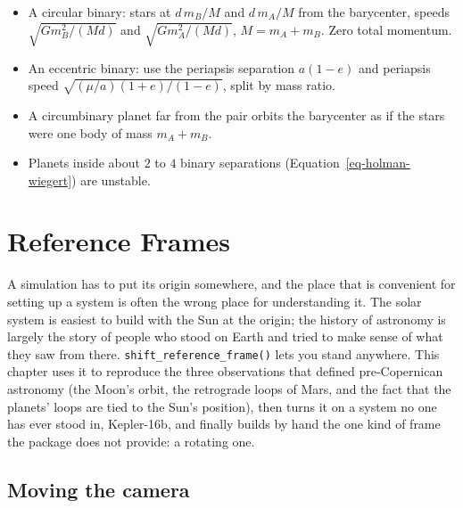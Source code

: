 \documentclass[
  10.5pt,
  letterpaper,
]{scrbook}
\providecommand{\tightlist}{%
  \setlength{\itemsep}{0pt}\setlength{\parskip}{0pt}}
\theoremstyle{plain}
\theoremstyle{remark}
\begin{document}
\begin{tcolorbox}[enhanced jigsaw, arc=.35mm, bottomrule=.15mm, bottomtitle=1mm, breakable, colback=white, colbacktitle=quarto-callout-tip-color!10!white, colframe=quarto-callout-tip-color-frame, coltitle=black, left=2mm, leftrule=.75mm, opacityback=0, opacitybacktitle=0.6, rightrule=.15mm, title={Key results}, titlerule=0mm, toprule=.15mm, toptitle=1mm]

\begin{itemize}
\tightlist
\item
  A circular binary: stars at \(d\,m_B/M\) and \(d\,m_A/M\) from the
  barycenter, speeds \(\sqrt{G m_B^2/(Md)}\) and
  \(\sqrt{G m_A^2/(Md)}\), \(M = m_A + m_B\). Zero total momentum.
\item
  An eccentric binary: use the periapsis separation \(a(1-e)\) and
  periapsis speed \(\sqrt{(\mu/a)(1+e)/(1-e)}\), split by mass ratio.
\item
  A circumbinary planet far from the pair orbits the barycenter as if
  the stars were one body of mass \(m_A + m_B\).
\item
  Planets inside about \(2\) to \(4\) binary separations
  (Equation~\ref{eq-holman-wiegert}) are unstable.
\end{itemize}

\end{tcolorbox}

\chapter{Reference Frames}\label{sec-reference-frames}

A simulation has to put its origin somewhere, and the place that is
convenient for setting up a system is often the wrong place for
understanding it. The solar system is easiest to build with the Sun at
the origin; the history of astronomy is largely the story of people who
stood on Earth and tried to make sense of what they saw from there.
\texttt{shift\_reference\_frame()} lets you stand anywhere. This chapter
uses it to reproduce the three observations that defined pre-Copernican
astronomy (the Moon's orbit, the retrograde loops of Mars, and the fact
that the planets' loops are tied to the Sun's position), then turns it
on a system no one has ever stood in, Kepler-16b, and finally builds by
hand the one kind of frame the package does not provide: a rotating one.

\section{Moving the camera}\label{moving-the-camera}
\end{document}
